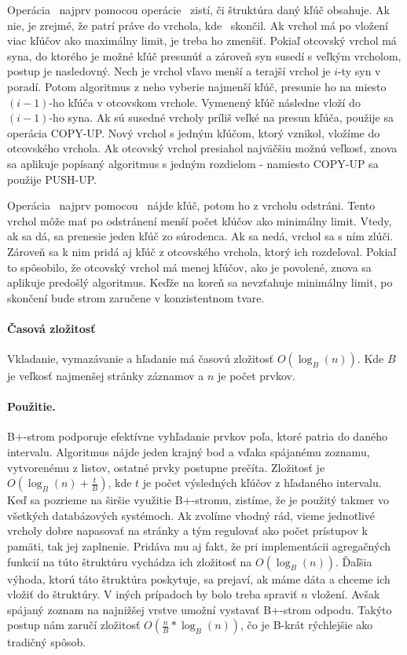 Operácia \insert\ najprv pomocou operácie \find\ zistí, či štruktúra daný kľúč obsahuje. Ak nie, je zrejmé, že patrí práve do vrchola, kde \find\ skončil. Ak vrchol má po vložení viac kľúčov ako maximálny limit, je treba ho zmenšiť. Pokiaľ otcovský vrchol má syna, do ktorého je možné kľúč presunúť a zároveň syn susedí s veľkým vrcholom, postup je nasledovný. Nech je vrchol vľavo menší a terajší vrchol je $i$-ty syn v poradí. Potom algoritmus z neho vyberie najmenší kľúč, presunie ho na miesto $(i-1)$-ho kľúča v otcovskom vrchole. Vymenený kľúč následne vloží do $(i-1)$-ho syna. Ak sú susedné vrcholy príliš veľké na presun kľúča, použije sa operácia COPY-UP. Nový vrchol s jedným kľúčom, ktorý vznikol, vložíme do otcovského vrchola. Ak otcovský vrchol presiahol najväčšiu možnú veľkosť, znova sa aplikuje popísaný algoritmus s jedným rozdielom - namiesto COPY-UP sa použije PUSH-UP.

Operácia \delete\ najprv pomocou \find\ nájde kľúč, potom ho z vrcholu odstráni. Tento vrchol môže mať po odstránení menší počet kľúčov ako minimálny limit. Vtedy, ak sa dá, sa prenesie jeden kľúč zo súrodenca. Ak sa nedá, vrchol sa s ním zlúči. Zároveň sa k nim pridá aj kľúč z otcovského vrchola, ktorý ich rozdeľoval. Pokiaľ to spôsobilo, že otcovský vrchol má menej kľúčov, ako je povolené, znova sa aplikuje predošlý algoritmus. Keďže na koreň sa nevzťahuje minimálny limit, po skončení bude strom zaručene v konzistentnom tvare.

\paragraph{Časová zložitosť}
Vkladanie, vymazávanie a hľadanie má časovú zložitosť $O(\log_B(n))$\citet{sahni}. Kde $B$ je veľkosť najmenšej stránky záznamov a $n$ je počet prvkov.

\paragraph{Použitie.}
B+-strom podporuje efektívne vyhľadanie prvkov poľa, ktoré patria do daného intervalu\citet{sahni}. Algoritmus nájde jeden krajný bod a vďaka spájanému zoznamu, vytvorenému z listov, ostatné prvky postupne prečíta. Zložitosť je $O(\log_B(n) + \frac{t}{B})$, kde $t$ je počet výsledných kľúčov z hľadaného intervalu.
Keď sa pozrieme na širšie využitie B+-stromu, zistíme, že je použitý takmer vo všetkých databázových systémoch. Ak zvolíme vhodný rád, vieme jednotlivé vrcholy dobre napasovať na stránky a tým regulovať ako počet prístupov k pamäti, tak jej zaplnenie\citet{sahni}. Pridáva mu aj fakt, že pri implementácii agregačných funkcií na túto štruktúru vychádza ich zložitosť na $O(\log_B(n))$.
Ďaľšia výhoda, ktorú táto štruktúra poskytuje, sa prejaví, ak máme dáta a chceme ich vložiť do štruktúry. V iných prípadoch by bolo treba spraviť $n$ vložení. Avšak spájaný zoznam na najnižšej vrstve umožní vystavať B+-strom odpodu. Takýto postup nám zaručí zložitosť $O(\frac{n}{B}*\log_B(n))$, čo je B-krát rýchlejšie ako tradičný spôsob.

